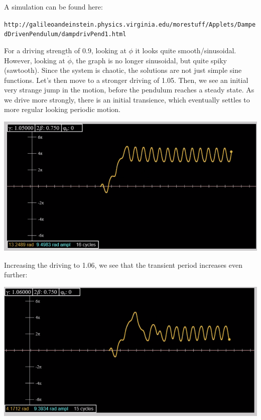 A simulation can be found here:
\begin{center}
    \texttt{http://galileoandeinstein.physics.virginia.edu/more\textunderscore stuff/Applets/DampedDrivenPendulum/dampdrivPend\textunderscore\textunderscore1.html}
\end{center}

For a driving strength of $0.9$, looking at $\phi$ it looks quite smooth/sinusoidal. However, looking at $\dot{\phi}$, the graph is no longer sinusoidal, but quite spiky (sawtooth). Since the system is chaotic, the solutions are not just simple sine functions. Let's then move to a stronger driving of 1.05. Then, we see an initial very strange jump in the motion, before the pendulum reaches a steady state. As we drive more strongly, there is an initial transience, which eventually settles to more regular looking periodic motion.
\begin{center}
    \includegraphics[scale=0.5]{Lecture-32/l32-img2.png}
\end{center}
Increasing the driving to 1.06, we see that the transient period increases even further:
\begin{center}
    \includegraphics[scale=0.5]{Lecture-32/l32-img3.png}
\end{center}
